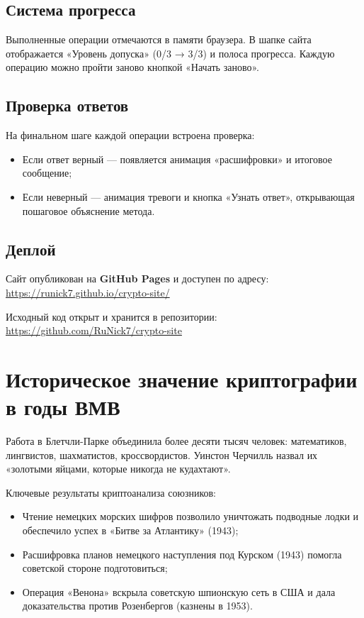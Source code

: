 \documentclass[12pt, a4paper]{article}
\begin{document}
\subsection{Система прогресса}

Выполненные операции отмечаются в памяти браузера. В шапке сайта отображается
«Уровень допуска» (0/3 → 3/3) и полоса прогресса. Каждую операцию можно
пройти заново кнопкой «Начать заново».

\subsection{Проверка ответов}

На финальном шаге каждой операции встроена проверка:
\begin{itemize}[leftmargin=1.5cm, itemsep=2pt]
  \item Если ответ верный --- появляется анимация «расшифровки» и итоговое
        сообщение;
  \item Если неверный --- анимация тревоги и кнопка «Узнать ответ»,
        открывающая пошаговое объяснение метода.
\end{itemize}

\subsection{Деплой}

Сайт опубликован на \textbf{GitHub Pages} и доступен по адресу:
\url{https://runick7.github.io/crypto-site/}

Исходный код открыт и хранится в репозитории:
\url{https://github.com/RuNick7/crypto-site}

\section{Историческое значение криптографии в годы ВМВ}

Работа в Блетчли-Парке объединила более десяти тысяч человек: математиков,
лингвистов, шахматистов, кроссвордистов. Уинстон Черчилль назвал их
«золотыми яйцами, которые никогда не кудахтают».

Ключевые результаты криптоанализа союзников:
\begin{itemize}[leftmargin=1.5cm, itemsep=3pt]
  \item Чтение немецких морских шифров позволило уничтожать подводные лодки
        и обеспечило успех в «Битве за Атлантику» (1943);
  \item Расшифровка планов немецкого наступления под Курском (1943) помогла
        советской стороне подготовиться;
  \item Операция «Венона» вскрыла советскую шпионскую сеть в США и дала
        доказательства против Розенбергов (казнены в 1953).
\end{itemize}
\end{document}
